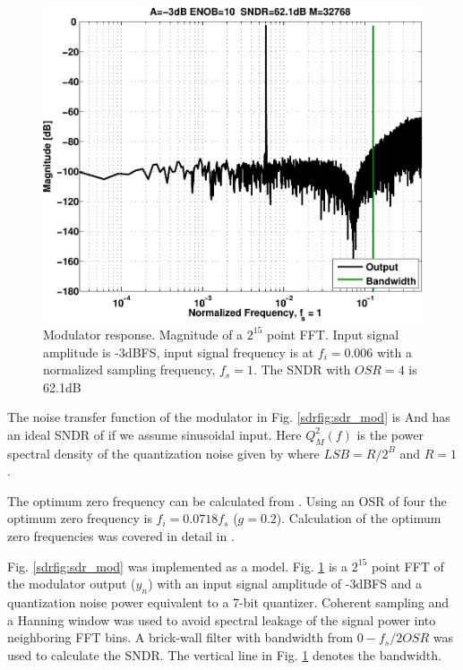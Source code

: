 \begin{figure}[htbp]
\centerline{ \includegraphics[width=\myfigwidth]{graphics/osdr}}
  \caption{Modulator response. Magnitude of a $2^{15}$ point
    FFT. Input signal amplitude is -3dBFS, input signal frequency is
    at $f_i = 0.006$ with a normalized sampling frequency, $f_s=1$.
  The SNDR with $OSR=4$ is 62.1dB}
  \label{sdrfig:osdr}
\end{figure}


The noise transfer function of the modulator in Fig.
\ref{sdrfig:sdr_mod} is
And has an ideal SNDR of 
if we assume sinusoidal input. Here $Q_M^2(f)$ is the power spectral density of the quantization noise
given by
where $LSB = R/2^B$ and $R=1$. 


The optimum zero frequency can be calculated from . Using an
OSR of four the optimum zero frequency is
$f_i = 0.0718 f_s$ ($g=0.2$). Calculation of the optimum zero
frequencies was covered in detail in \cite{schreier93}.


Fig.
\ref{sdrfig:sdr_mod} was implemented as a \simulink model.
 Fig. \ref{sdrfig:osdr} is a $2^{15}$ point
FFT of the modulator output ($y_n$) with an input signal amplitude of -3dBFS and a
quantization noise power equivalent
to a 7-bit quantizer. Coherent sampling and a Hanning window was used
to avoid spectral leakage of the signal power into neighboring FFT
bins. A brick-wall filter with bandwidth from $0 - f_s/2OSR$ was
used to calculate the SNDR. The
vertical line in Fig. \ref{sdrfig:osdr} denotes the bandwidth. 


